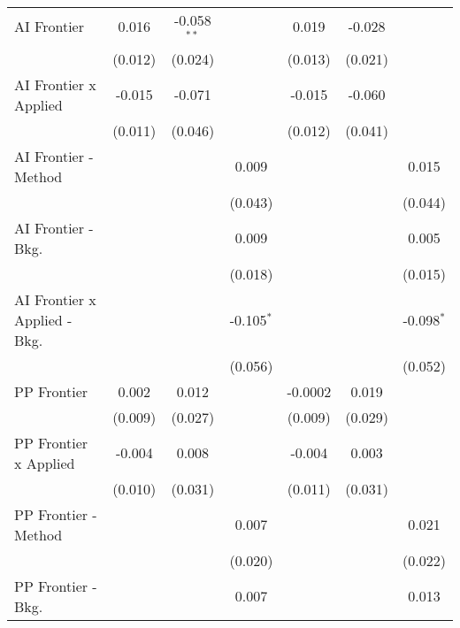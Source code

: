 \begin{tabular}{lcccccc}
   AI Frontier                    & 0.016       & -0.058$^{**}$ &              & 0.019       & -0.028      &   \\   
                                  & (0.012)     & (0.024)       &              & (0.013)     & (0.021)     &   \\   
   AI Frontier x Applied          & -0.015      & -0.071        &              & -0.015      & -0.060      &   \\   
                                  & (0.011)     & (0.046)       &              & (0.012)     & (0.041)     &   \\   
   AI Frontier - Method           &             &               & 0.009        &             &             & 0.015\\   
                                  &             &               & (0.043)      &             &             & (0.044)\\   
   AI Frontier - Bkg.             &             &               & 0.009        &             &             & 0.005\\   
                                  &             &               & (0.018)      &             &             & (0.015)\\   
   AI Frontier x Applied - Bkg.   &             &               & -0.105$^{*}$ &             &             & -0.098$^{*}$\\   
                                  &             &               & (0.056)      &             &             & (0.052)\\   
   PP Frontier                    & 0.002       & 0.012         &              & -0.0002     & 0.019       &   \\   
                                  & (0.009)     & (0.027)       &              & (0.009)     & (0.029)     &   \\   
   PP Frontier x Applied          & -0.004      & 0.008         &              & -0.004      & 0.003       &   \\   
                                  & (0.010)     & (0.031)       &              & (0.011)     & (0.031)     &   \\   
   PP Frontier - Method           &             &               & 0.007        &             &             & 0.021\\   
                                  &             &               & (0.020)      &             &             & (0.022)\\   
   PP Frontier - Bkg.             &             &               & 0.007        &             &             & 0.013\\   

\end{tabular}
